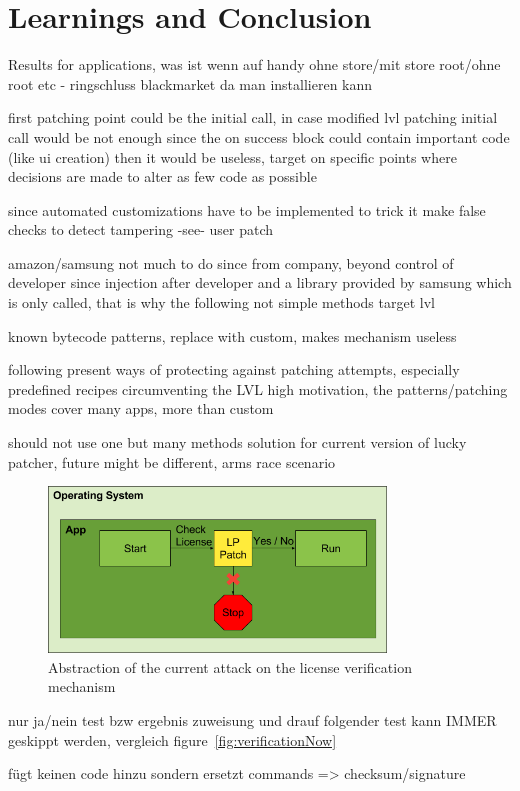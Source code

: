 \section{Learnings and Conclusion} \label{section:luckypatcher-learnings}


Results for applications, was ist wenn auf handy ohne store/mit store root/ohne root etc - ringschluss blackmarket da man installieren kann

first patching point could be the initial call, in case modified lvl patching initial call would be not enough since the on success block could contain important code (like ui creation) then it would be useless, target on specific points where decisions are made to alter as few code as possible

since automated customizations have to be implemented to trick it
make false checks to detect tampering -see- user patch

amazon/samsung not much to do since from company, beyond control of developer since injection after developer and a library provided by samsung which is only called, that is why the following not simple methods target lvl

known bytecode patterns, replace with custom, makes mechanism useless

following present ways of protecting against patching attempts, especially predefined recipes circumventing the LVL
high motivation, the patterns/patching modes cover many apps, more than custom

should not use one but many methods
solution for current version of lucky patcher, future might be different, arms race scenario
\cite{munteanLicense}
%

\begin{figure}[h]
    \centering
    \includegraphics[width=0.8\textwidth]{data/verificationNowAttack.png}
    \caption{Abstraction of the current attack on the license verification mechanism}
    \label{fig:verificationNowAttack}
\end{figure}

nur ja/nein test bzw ergebnis zuweisung und drauf folgender test kann IMMER geskippt werden, vergleich figure~\ref{fig:verificationNow}



fügt keinen code hinzu sondern ersetzt commands => checksum/signature
